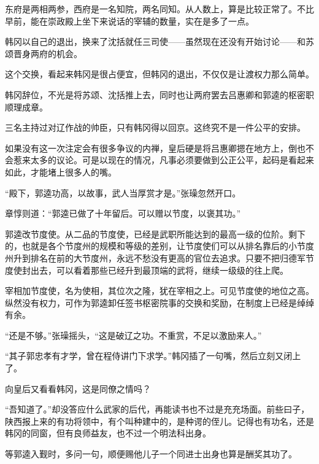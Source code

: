 东府是两相两参，西府是一名知院，两名同知。从人数上，算是比较正常了。不比早前，能在崇政殿上坐下来说话的宰辅的数量，实在是多了一点。

韩冈以自己的退出，换来了沈括就任三司使——虽然现在还没有开始讨论——和苏颂晋身两府的机会。

这个交换，看起来韩冈是很占便宜，但韩冈的退出，不仅仅是让渡权力那么简单。

韩冈辞位，不光是将苏颂、沈括推上去，同时也让两府罢去吕惠卿和郭逵的枢密职顺理成章。

三名主持过对辽作战的帅臣，只有韩冈得以回京。这终究不是一件公平的安排。

如果没有这一次注定会有很多争议的内禅，皇后硬是将吕惠卿摁在地方上，倒也不会惹来太多的议论。可是以现在的情况，凡事必须要做到公正公平，起码是看起来如此，才能堵上很多人的嘴。

“殿下，郭逵功高，以故事，武人当厚赏才是。”张璪忽然开口。

章惇则道：“郭逵已做了十年留后。可以赠以节度，以褒其功。”

郭逵改节度使。从二品的节度使，已经是武职所能达到的最高一级的位阶。剩下的，也就是各个节度州的规模和等级的差别，让节度使们可以从排名靠后的小节度州升到排名在前的大节度州，永远不愁没有更高的官位去追求。只要不把归德军节度使封出去，可以看着那些已经升到最顶端的武将，继续一级级的往上爬。

宰相加节度使，名为使相，其位次之隆，犹在宰相之上。可见节度使的地位之高。纵然没有权力，可作为郭逵卸任签书枢密院事的交换和奖励，在制度上已经是绰绰有余。

“还是不够。”张璪摇头，“这是破辽之功。不重赏，不足以激励来人。”

“其子郭忠孝有才学，曾在程侍讲门下求学。”韩冈插了一句嘴，然后立刻又闭上了。

向皇后又看看韩冈，这是同僚之情吗？

“吾知道了。”却没答应什么武家的后代，再能读书也不过是充充场面。前些曰子，陕西报上来的有功将领中，有个叫种建中的，是种谔的侄儿。记得也有功名，还是韩冈的同窗，但有良师益友，也不过一个明法科出身。

等郭逵入觐时，多问一句，顺便赐他儿子一个同进士出身也算是酬奖其功了。

